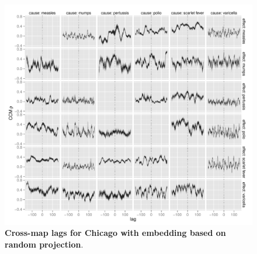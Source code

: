 \documentclass[10pt]{article}
\begin{document}
\begin{figure}
\begin{center}
  \includegraphics[width=5in]{dataflow/out/fig_cities_corrbylag/chi_cross_projection_plot.pdf}
  \end{center}
  \caption{\textbf{Cross-map lags for Chicago with embedding based on random projection}.  \label{fig:chi_rand_tmp}}
\end{figure}
\end{document}
